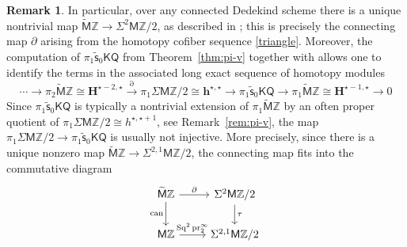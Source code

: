 \documentclass[11pt,hyp,english]{article}
\newcommand{\Z}{\mathbb{Z}}
\renewcommand{\AA}{\mathcal{A}}
\newcommand{\KQ}{\mathsf{KQ}}
\newcommand{\MZ}{\mathsf{M}\Z}
\newcommand{\HZ}{\mathsf{M}\Z}
\newcommand{\cHZ}{\wt{{\mathsf{M}}}{\Z}}
\newcommand{\HWZ}{\mathsf{W}\Z}
\newcommand{\Sq}{\operatorname{Sq}}
\newcommand{\wt}[1]{\widetilde{#1}}
\newcommand{\pr}{\operatorname{pr}}
\newcommand{\vs}{\tilde{\mathsf{s}}}
\newtheorem{lemma}[theorem]{Lemma}
\theoremstyle{definition}
\newtheorem{remark}[theorem]{Remark}
\begin{document}
\begin{remark}
\label{rem:v-fiber}
In particular, over any connected Dedekind scheme there is a unique nontrivial map $\cHZ \to \Sigma^2 \HZ/2$, as described in ; this is precisely the connecting map $\partial$ arising from the homotopy cofiber sequence \eqref{triangle}. Moreover, the computation of $\pi_1 \vs_{0}\KQ$ from Theorem~\ref{thm:pi-v} together with \cite[Theorem 17]{Bachmann} allows one to identify the terms in the associated long exact sequence of homotopy modules
\[ 
\dotsm \to \pi_2\cHZ \cong \mathbf{H}^{\star-2,\star} 
\xrightarrow{\partial}
\pi_1\Sigma\MZ/2 \cong \mathbf{h}^{\star,\star} 
\to \pi_1\vs_{0}\KQ  \to \pi_1\cHZ  \cong \mathbf{H}^{\star-1,\star} \to 0
\]
Since $\pi_1\vs_{0}\KQ $ is typically a nontrivial extension of $\pi_1\cHZ$ by an often proper quotient of $\pi_1\Sigma\MZ/2 \cong h^{\star,\star+1}$, 
see Remark~\ref{rem:pi-v}, 
the map $\pi_1\Sigma\MZ/2\to \pi_1\vs_{0}\KQ $ is usually not injective.
More precisely, 
since there is a unique nonzero map $\cHZ\to \Sigma^{2,1}\HZ/2$, 
the connecting map fits into the commutative diagram
\[
\begin{tikzcd}
\cHZ \ar[r,"\partial"] \ar[d,swap,"\mathrm{can}"] & \Sigma^2 \HZ/2 \ar[d,"\tau"] \\
\HZ \ar[r,"\Sq^2\pr^\infty_2"] & \Sigma^{2,1}\HZ/2
\end{tikzcd}
\]
\end{remark}

\end{document}
